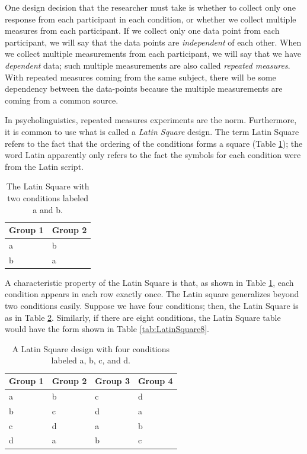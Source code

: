 \documentclass[
  12pt,
]{krantz}
\theoremstyle{definition}
\theoremstyle{definition}
\theoremstyle{definition}
\theoremstyle{definition}
\theoremstyle{remark}
\begin{document}
One design decision that the researcher must take is whether to collect only one response from each participant in each condition, or whether we collect multiple measures from each participant. If we collect only one data point from each participant, we will say that the data points are \emph{independent} of each other. When we collect multiple measurements from each participant, we will say that we have \emph{dependent} data; such multiple measurements are also called \emph{repeated measures}. With repeated measures coming from the same subject, there will be some dependency between the data-points because the multiple measurements are coming from a common source.

In psycholinguistics, repeated measures experiments are the norm. Furthermore, it is common to use what is called a \emph{Latin Square} design. The term Latin Square refers to the fact that the ordering of the conditions forms a square (Table \ref{tab:LatinSquare}); the word Latin apparently only refers to the fact the symbols for each condition were from the Latin script.

\begin{table}

\caption{\label{tab:LatinSquare}The Latin Square with two conditions labeled a and b.}
\centering
\begin{tabular}[t]{ll}
\hline
Group 1 & Group 2\\
\hline
a & b\\
\hline
b & a\\
\hline
\end{tabular}
\end{table}

A characteristic property of the Latin Square is that, as shown in Table \ref{tab:LatinSquare}, each condition appears in each row exactly once. The Latin square generalizes beyond two conditions easily. Suppose we have four conditions; then, the Latin Square is as in Table \ref{tab:LatinSquare4}. Similarly, if there are eight conditions, the Latin Square table would have the form shown in Table \ref{tab:LatinSquare8}.

\begin{table}

\caption{\label{tab:LatinSquare4}A Latin Square design with four conditions labeled a, b, c, and d.}
\centering
\begin{tabular}[t]{llll}
\toprule
Group 1 & Group 2 & Group 3 & Group 4\\
\midrule
a & b & c & d\\
b & c & d & a\\
c & d & a & b\\
d & a & b & c\\
\bottomrule
\end{tabular}
\end{table}
\end{document}
